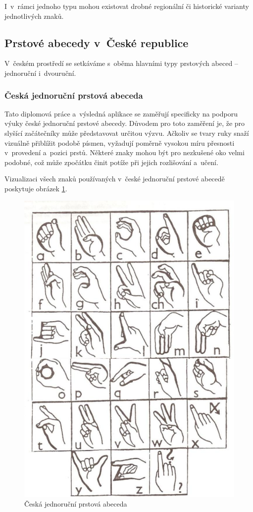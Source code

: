 \documentclass[
  master,
  program=ainfvs,
  biblatex,
  figures=true,
  tables=false,
  sourcecodes=true,
  glossaries,
  index
]{kidiplom}
\begin{document}
    I~v~rámci jednoho typu mohou existovat drobné regionální či historické varianty jednotlivých znaků.

    \subsection{Prstové abecedy v~České republice}
    
        V~českém prostředí se setkáváme s~oběma hlavními typy prstových abeced – jednoruční i~dvouruční.
    
        \subsubsection{Česká jednoruční prstová abeceda}
        
            Tato diplomová práce a~výsledná aplikace se zaměřují specificky na podporu výuky české jednoruční prstové abecedy. Důvodem pro toto zaměření je, že pro slyšící začátečníky může představovat určitou výzvu. Ačkoliv se tvary ruky snaží vizuálně přiblížit podobě písmen, vyžadují poměrně vysokou míru přesnosti v~provedení a~pozici prstů. Některé znaky mohou být pro nezkušené oko velmi podobné, což může zpočátku činit potíže při jejich rozlišování a~učení. 
        
        
            Vizualizaci všech znaků používaných v~české jednoruční prstové abecedě poskytuje obrázek \ref{prstova-abeceda}.
        
        \begin{figure}[htbp]
            \centering
            \includegraphics[width=0.5\columnwidth]{graphics/prstova-abeceda.png}
            \caption{Česká jednoruční prstová abeceda \cite{prstova-abeceda}}
            \label{prstova-abeceda}
        \end{figure}
        
\end{document}
